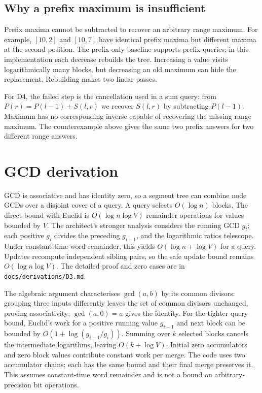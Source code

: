 \documentclass[11pt,a4paper]{article}
\begin{document}
\subsection{Why a prefix maximum is insufficient}
Prefix maxima cannot be subtracted to recover an arbitrary range maximum. For example, $[10,2]$ and $[10,7]$ have identical prefix maxima but different maxima at the second position. The prefix-only baseline supports prefix queries; in this implementation each decrease rebuilds the tree. Increasing a value visits logarithmically many blocks, but decreasing an old maximum can hide the replacement. Rebuilding makes two linear passes.

For D4, the failed step is the cancellation used in a sum query: from $P(r)=P(l-1)+S(l,r)$ we recover $S(l,r)$ by subtracting $P(l-1)$. Maximum has no corresponding inverse capable of recovering the missing range maximum. The counterexample above gives the same two prefix answers for two different range answers.
\section{GCD derivation}
GCD is associative and has identity zero, so a segment tree can combine node GCDs over a disjoint cover of a query. A query selects $O(\log n)$ blocks. The direct bound with Euclid is $O(\log n\log V)$ remainder operations for values bounded by $V$. The architect's stronger analysis considers the running GCD $g_i$: each positive $g_i$ divides the preceding $g_{i-1}$, and the logarithmic ratios telescope. Under constant-time word remainder, this yields $O(\log n+\log V)$ for a query. Updates recompute independent sibling pairs, so the safe update bound remains $O(\log n\log V)$. The detailed proof and zero cases are in \texttt{docs/derivations/D3.md}.

The algebraic argument characterises $\gcd(a,b)$ by its common divisors: grouping three inputs differently leaves the set of common divisors unchanged, proving associativity; $\gcd(a,0)=a$ gives the identity. For the tighter query bound, Euclid's work for a positive running value $g_{i-1}$ and next block can be bounded by $O(1+\log(g_{i-1}/g_i))$. Summing over $k$ selected blocks cancels the intermediate logarithms, leaving $O(k+\log V)$. Initial zero accumulators and zero block values contribute constant work per merge. The code uses two accumulator chains; each has the same bound and their final merge preserves it. This assumes constant-time word remainder and is not a bound on arbitrary-precision bit operations.
\end{document}

